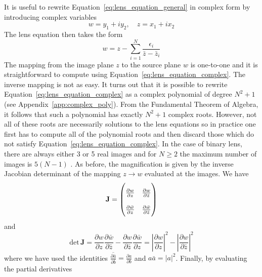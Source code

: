 \documentclass[12pt,dvipsnames]{report}
\begin{document}
It is useful to rewrite Equation~\ref{eq:lens_equation_general} in complex form
by introducing complex variables \citep{1990A&A...236..311W}
\begin{equation}
    w= y_1+iy_2,\quad z=x_1+ix_2
\end{equation}
The lens equation then takes the form
\begin{equation}
    w=z-\sum_{i=1}^N \frac{\epsilon_i}{\bar z-\bar z_i}
    \label{eq:lens_equation_complex}
\end{equation}
The mapping from the image plane $z$ to the source plane $w$ is one-to-one and it is
straightforward to compute using Equation~\ref{eq:lens_equation_complex}. The inverse
mapping is not as easy. It turns out that it is possible to rewrite Equation~\ref{eq:lens_equation_complex}
as a complex polynomial of degree $N^2 + 1$ (see Appendix~\ref{app:complex_poly}).
From the Fundamental Theorem of Algebra, it follows that such a polynomial has exactly $N^2+1$ complex roots.
However, not all of these roots are necessarily solutions to the lens equations so in practice one first has to
compute all of the polynomial roots and then discard those which do not satisfy
Equation~\ref{eq:lens_equation_complex}.
In the case of binary lens, there are always either 3 or 5 real images and for $N\geq 2$ the maximum number
of images is $5(N-1)$ \citep{arXiv:astro-ph/0103463,astro-ph/0305166,arXiv:math/0401188v2}.
As before, the magnification is given by the inverse Jacobian determinant of the mapping $z\rightarrow w$
evaluated at the images. We have
\begin{equation}
    \mathbf{J}=
    \renewcommand\arraystretch{2}
    \begin{pmatrix}
        \frac{\partial w}{\partial z} & \frac{\partial w}{\partial \bar{z}} \\ \frac{\partial \bar{w}}{\partial z} & \frac{\partial \bar{w}}{\partial \bar{z}}
    \end{pmatrix}
\end{equation}
and
\begin{equation}
    \mathrm{det}\,\mathbf{J}=\frac{\partial w}{\partial z}\frac{\partial \bar{w}}{\partial \bar{z}} - \frac{\partial w}{\partial \bar{z}}\frac{\partial \bar{w}}{\partial z} = \left|\frac{\partial w}{\partial z}\right|^2 - \left|\frac{\partial w}{\partial \bar{z}}\right|^2
\end{equation}
where we have used the identities
$\overline{\frac{\partial\bar a}{\partial{\bar b}}}=\frac{\partial a}{\partial{b}}$ and $a\bar a=|a|^2$. Finally, by evaluating the partial derivatives
\end{document}
